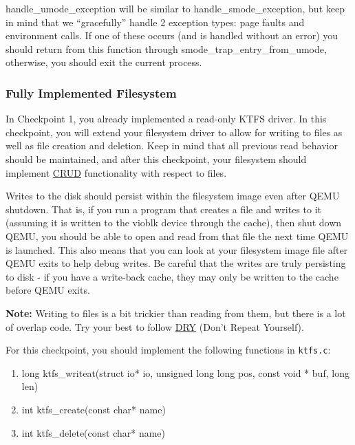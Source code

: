 \documentclass{article}
\begin{document}
		{\fix handle\_umode\_exception} will be similar to {\fix handle\_smode\_exception}, but keep in mind that we ``gracefully'' handle 2
		exception types: page faults and environment calls. If one of these occurs (and is handled without an error) you should return from this function
		through {\fix smode\_trap\_entry\_from\_umode}, otherwise, you should exit the current process.
		
		
        \subsubsection{Fully Implemented Filesystem}

        In Checkpoint 1, you already implemented a read-only KTFS driver. In this checkpoint, you will extend your filesystem driver to allow for writing to files as well as
        file creation and deletion. Keep in mind that all previous read behavior should be maintained, and after this checkpoint, your filesystem should implement \href{https://en.wikipedia.org/wiki/Create,_read,_update_and_delete}{CRUD} functionality
		with respect to files.

		Writes to the disk should persist within the filesystem image even after QEMU shutdown. That is, if you run a program that creates a file and writes to it (assuming it is written to the vioblk device through the cache),
		then shut down QEMU, you should be able to open and read from that file the next time QEMU is launched. This also means that you can look at your filesystem image file after QEMU exits to help debug writes. Be careful that
        the writes are truly persisting to disk - if you have a write-back cache, they may only be written to the cache before QEMU exits.

		\textbf{Note:} Writing to files is a bit trickier than reading from them, but there is a lot of overlap code. Try your best to follow \href{https://en.wikipedia.org/wiki/Don%27t_repeat_yourself}{DRY} (Don't Repeat Yourself).

		For this checkpoint, you should implement the following functions in \texttt{ktfs.c}:

        \begin{enumerate}
            \item {\fix long ktfs\_writeat(struct io* io, unsigned long long pos, const void * buf, long len)}
            \item {\fix int ktfs\_create(const char* name)}
            \item {\fix int ktfs\_delete(const char* name)}
        \end{enumerate}
\end{document}
